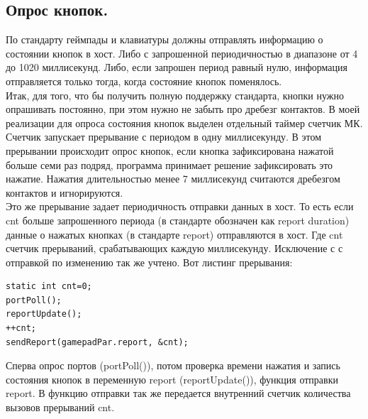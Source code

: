 \documentclass[12pt,a4paper]{article}
\begin{document}
\subsection{Опрос кнопок.}
    По стандарту геймпады и клавиатуры должны отправлять информацию о состоянии
    кнопок в хост. Либо с запрошенной периодичностью в диапазоне
    от 4 до 1020 миллисекунд. Либо, если запрошен период равный нулю, информация
    отправляется только тогда, когда состояние кнопок поменялось.\\
    Итак, для того, что бы получить полную поддержку стандарта, кнопки нужно
    опрашивать постоянно, при этом нужно не забыть про дребезг контактов.
    В моей реализации для опроса состояния кнопок выделен отдельный таймер
    счетчик МК. Счетчик запускает прерывание с периодом в одну миллисекунду.
    В этом прерывании происходит опрос кнопок, если кнопка зафиксирована
    нажатой больше семи раз подряд, программа принимает решение зафиксировать
    это нажатие. Нажатия длительностью менее 7 миллисекунд считаются дребезгом
    контактов и игнорируются.\\
    Это же прерывание задает периодичность отправки данных в хост. То есть
    если cnt больше запрошенного периода (в стандарте обозначен как report duration)
    данные о нажатых кнопках (в стандарте report) отправляются в хост. Где cnt
    счетчик прерываний, срабатывающих каждую миллисекунду. Исключение с
    с отправкой по изменению так же учтено. Вот листинг прерывания:
\lstset{language=c}
\begin{lstlisting}
static int cnt=0;
portPoll();
reportUpdate();
++cnt;
sendReport(gamepadPar.report, &cnt);
\end{lstlisting}
    Сперва опрос портов (portPoll()), потом проверка времени нажатия и запись
    состояния кнопок в переменную report (reportUpdate()), функция отправки
    report. В функцию отправки так же передается внутренний счетчик количества
    вызовов прерываний cnt.
\end{document}
